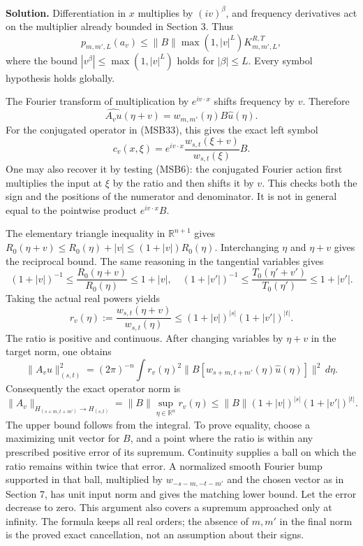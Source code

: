 \documentclass[
  11pt,
]{article}
\begin{document}
\textbf{Solution.} Differentiation in \(x\) multiplies by
\((iv)^\beta\), and frequency derivatives act on the multiplier already
bounded in Section 3. Thus \[
 p_{m,m',L}(a_v)
 \leq\|B\|\max(1,|v|^L)K^{R,T}_{m,m',L},
 \tag{MSB40}
\] where the bound \(|v^\beta|\leq\max(1,|v|^L)\) holds for
\(|\beta|\leq L\). Every symbol hypothesis holds globally.

The Fourier transform of multiplication by \(e^{iv\cdot x}\) shifts
frequency by \(v\). Therefore \[
 \widehat {A_vu}(\eta+v)=w_{m,m'}(\eta)B\widehat u(\eta).
\] For the conjugated operator in (MSB33), this gives the exact left
symbol \[
 c_v(x,\xi)=e^{iv\cdot x}
       \frac{w_{s,t}(\xi+v)}{w_{s,t}(\xi)}B.
 \tag{MSB41}
\] One may also recover it by testing (MSB6): the conjugated Fourier
action first multiplies the input at \(\xi\) by the ratio and then
shifts it by \(v\). This checks both the sign and the positions of the
numerator and denominator. It is not in general equal to the pointwise
product \(e^{iv\cdot x}B\).

The elementary triangle inequality in \(\mathbb R^{n+1}\) gives
\(R_0(\eta+v)\leq R_0(\eta)+|v|\leq(1+|v|)R_0(\eta)\). Interchanging
\(\eta\) and \(\eta+v\) gives the reciprocal bound. The same reasoning
in the tangential variables gives \[
 (1+|v|)^{-1}\leq\frac{R_0(\eta+v)}{R_0(\eta)}\leq1+|v|,
 \quad
 (1+|v'|)^{-1}\leq\frac{T_0(\eta'+v')}{T_0(\eta')}\leq1+|v'|.
\] Taking the actual real powers yields \[
 r_v(\eta):=\frac{w_{s,t}(\eta+v)}{w_{s,t}(\eta)}
 \leq(1+|v|)^{|s|}(1+|v'|)^{|t|}.
 \tag{MSB42}
\] The ratio is positive and continuous. After changing variables by
\(\eta+v\) in the target norm, one obtains \[
 \|A_vu\|_{(s,t)}^2
 =(2\pi)^{-n}\int r_v(\eta)^2
       \|B[w_{s+m,t+m'}(\eta)\widehat u(\eta)]\|^2\,d\eta.
\] Consequently the exact operator norm is \[
 \|A_v\|_{H_{(s+m,t+m')}\to H_{(s,t)}}
 =\|B\|\sup_{\eta\in\mathbb R^n}r_v(\eta)
 \leq\|B\|(1+|v|)^{|s|}(1+|v'|)^{|t|}.
 \tag{MSB43}
\] The upper bound follows from the integral. To prove equality, choose
a maximizing unit vector for \(B\), and a point where the ratio is
within any prescribed positive error of its supremum. Continuity
supplies a ball on which the ratio remains within twice that error. A
normalized smooth Fourier bump supported in that ball, multiplied by
\(w_{-s-m,-t-m'}\) and the chosen vector as in Section 7, has unit input
norm and gives the matching lower bound. Let the error decrease to zero.
This argument also covers a supremum approached only at infinity. The
formula keeps all real orders; the absence of \(m,m'\) in the final norm
is the proved exact cancellation, not an assumption about their signs.
\end{document}
